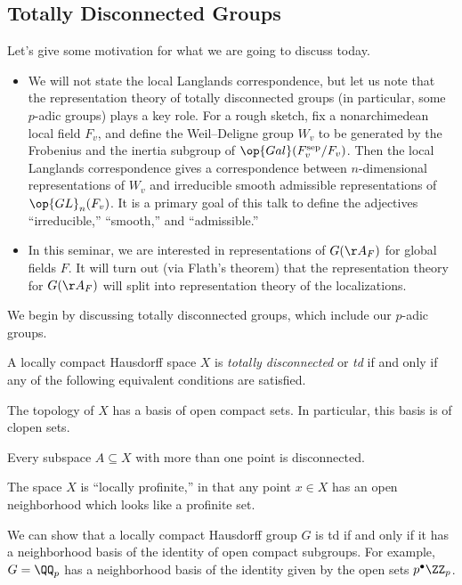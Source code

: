 \documentclass{article}
\begin{document}
\subsection{Totally Disconnected Groups}
Let's give some motivation for what we are going to discuss today.
\begin{itemize}
	\item We will not state the local Langlands correspondence, but let us note that the representation theory of totally disconnected groups (in particular, some $p$-adic groups) plays a key role. For a rough sketch, fix a nonarchimedean local field $F_v$, and define the Weil--Deligne group $W_v$ to be generated by the Frobenius and the inertia subgroup of $\op{Gal}(F_v^{\mathrm{sep}}/F_v)$. Then the local Langlands correspondence gives a correspondence between $n$-dimensional representations of $W_v$ and irreducible smooth admissible representations of $\op{GL}_n(F_v)$. It is a primary goal of this talk to define the adjectives ``irreducible,'' ``smooth,'' and ``admissible.''
	\item In this seminar, we are interested in representations of $G(\AA_F)$ for global fields $F$. It will turn out (via Flath's theorem) that the representation theory for $G(\AA_F)$ will split into representation theory of the localizations.
\end{itemize}
We begin by discussing totally disconnected groups, which include our $p$-adic groups.
\begin{definition}
	A locally compact Hausdorff space $X$ is \textit{totally disconnected} or \textit{td} if and only if any of the following equivalent conditions are satisfied.
	\begin{listalph}
		\item The topology of $X$ has a basis of open compact sets. In particular, this basis is of clopen sets.
		\item Every subspace $A\subseteq X$ with more than one point is disconnected.
		\item The space $X$ is ``locally profinite,'' in that any point $x\in X$ has an open neighborhood which looks like a profinite set.
	\end{listalph}
\end{definition}
\begin{example}
	We can show that a locally compact Hausdorff group $G$ is td if and only if it has a neighborhood basis of the identity of open compact subgroups. For example, $G=\QQ_p$ has a neighborhood basis of the identity given by the open sets $p^\bullet\ZZ_p$.
\end{example}
\end{document}
